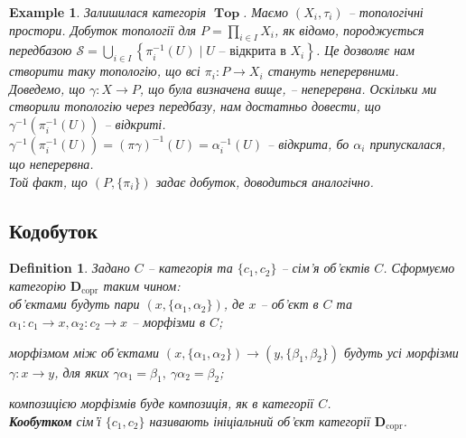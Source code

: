 \documentclass[a4paper, 10pt]{article}
\theoremstyle{theoremdd}
\newtheorem{definition}[theorem]{Definition}
\newtheorem{example}[theorem]{Example}
\DeclareMathOperator{\Top}{\textbf{Top}}
\begin{document}
\begin{example}
Залишилася категорія $\Top$. Маємо $(X_i,\tau_i)$ -- топологічні простори. Добуток топології для $P = \displaystyle\prod_{i \in I} X_i$, як відомо, породжується передбазою $\mathcal{S} = \displaystyle\bigcup_{i \in I}\left\{ \pi_i^{-1}(U) \mid U \text{ -- відкрита в } X_i \right\}$. Це дозволяє нам створити таку топологію, що всі $\pi_i \colon P \to X_i$ стануть неперервними.\\
Доведемо, що $\gamma \colon X \to P$, що була визначена вище, -- неперервна. Оскільки ми створили топологію через передбазу, нам достатньо довести, що $\gamma^{-1}(\pi_i^{-1}(U))$ -- відкриті.\\
$\gamma^{-1}(\pi_i^{-1}(U)) = (\pi \gamma)^{-1}(U) = \alpha_i^{-1}(U)$ -- відкрита, бо $\alpha_i$ припускалася, що неперервна.\\
Той факт, що $(P,\{\pi_i\})$ задає добуток, доводиться аналогічно.
\end{example}

\subsection{Кодобуток}
\begin{definition}
Задано $C$ -- категорія та $\{c_1,c_2\}$ -- сім'я об'єктів $C$. Сформуємо категорію $\textbf{D}_{\text{copr}}$ таким чином:\\
об'єктами будуть пари $(x,\{\alpha_1,\alpha_2\})$, де $x$ -- об'єкт в $C$ та $\alpha_1 \colon c_1 \to x, \alpha_2 \colon c_2 \to x$ -- морфізми в $C$;
\begin{figure}[H]
\centering
{}
\end{figure}
\noindent морфізмом між об'єктами $(x,\{\alpha_1,\alpha_2\}) \to (y,\{\beta_1,\beta_2\})$ будуть усі морфізми $\gamma \colon x \to y$, для яких $\gamma \alpha_1 = \beta_1,\ \gamma \alpha_2 = \beta_2$;
\begin{figure}[H]
\centering
{}
\end{figure}
\noindent композицією морфізмів буде композиція, як в категорії $C$.\\
\textbf{Кообутком} сім'ї $\{c_1,c_2\}$ називають ініціальний об'єкт категорії $\textbf{D}_{\text{copr}}$.
\end{definition}
\end{document}

